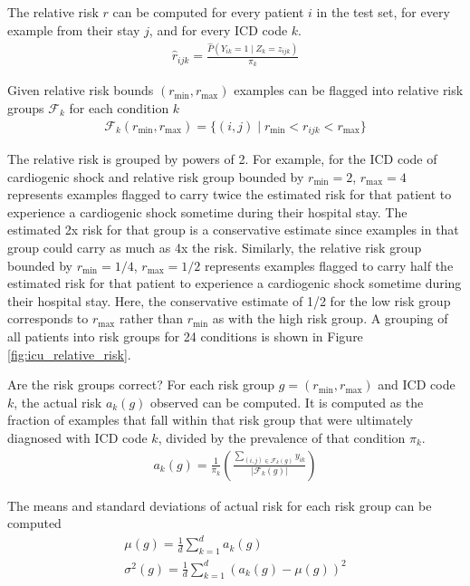 The relative risk $r$ can be computed for every patient $i$ in the test set, for every example from their stay $j$, and for every ICD code $k$.
\begin{gather}
    \hat{r}_{ijk} = \frac
        {\hat{P}(Y_{ik} = 1 \mid Z_k = z_{ijk})}
        {\pi_k}
\end{gather}

Given relative risk bounds $(r_{\min}, r_{\max})$ examples can be flagged into relative risk groups $\mathcal{F}_k$ for each condition $k$
\begin{gather}
    \mathcal{F}_k(r_{\min}, r_{\max}) = \{ (i, j) \mid r_{\min} < r_{ijk} < r_{\max} \}
\end{gather}

The relative risk is grouped by powers of 2.  For example, for the ICD code of cardiogenic shock and relative risk group bounded by $r_{\min} = 2$, $r_{\max} = 4$ represents examples flagged to carry twice the estimated risk for that patient to experience a cardiogenic shock sometime during their hospital stay.  The estimated 2x risk for that group is a conservative estimate since examples in that group could carry as much as 4x the risk.  Similarly, the relative risk group bounded by $r_{\min} = 1/4$, $r_{\max} = 1/2$ represents examples flagged to carry half the estimated risk for that patient to experience a cardiogenic shock sometime during their hospital stay.  Here, the conservative estimate of 1/2 for the low risk group corresponds to $r_{\max}$ rather than $r_{\min}$ as with the high risk group.  A grouping of all patients into risk groups for 24 conditions is shown in Figure \ref{fig:icu_relative_risk}.

Are the risk groups correct?  For each risk group $g = (r_{\min}, r_{\max})$ and ICD code $k$, the actual risk $a_k(g)$ observed can be computed.  It is computed as the fraction of examples that fall within that risk group that were ultimately diagnosed with ICD code $k$, divided by the prevalence of that condition $\pi_k$.
\begin{gather}
    a_k(g) = \frac{1}{\pi_k} \left( 
        \frac{\sum_{(i, j) \in \mathcal{F}_k(g)} y_{ik}}{|\mathcal{F}_k(g)|}
    \right)
\end{gather}

The means and standard deviations of actual risk for each risk group can be computed
\begin{gather}
    \mu(g) = \frac{1}{d} \sum_{k=1}^d a_k(g) \\
    \sigma^2(g) = \frac{1}{d} \sum_{k=1}^d (a_k(g) - \mu(g))^2
\end{gather}

